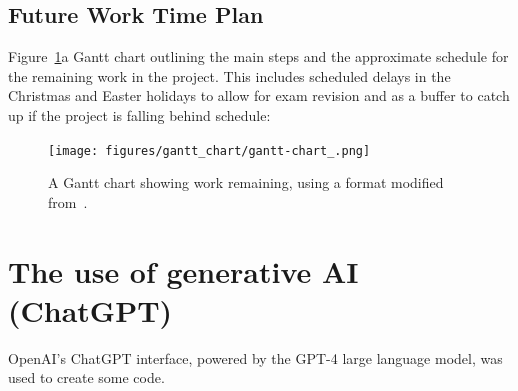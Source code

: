 \documentclass[12pt]{article}
\begin{document}
    \subsection{Future Work Time Plan}
    Figure~\ref{fig:gantt-chart_}a Gantt chart outlining the main steps and the approximate schedule for the remaining work in the project.
    This includes scheduled delays in the Christmas and Easter holidays to allow for exam revision and as a buffer to catch up if the project is falling behind schedule:

    \begin{landscape}
        \begin{figure}[p] %
            \centering
            \texttt{[image: figures/gantt\_chart/gantt-chart\_.png]}
            \caption{A Gantt chart showing work remaining, using a format modified from~\cite{DataCampGanttChart2021}.}
            \label{fig:gantt-chart_}
        \end{figure}
    \end{landscape}





























































    \FloatBarrier
    \appendix
    \section{The use of generative AI (ChatGPT)}
    OpenAI's ChatGPT interface, powered by the GPT-4 large language model, was used to create some code.
\end{document}
